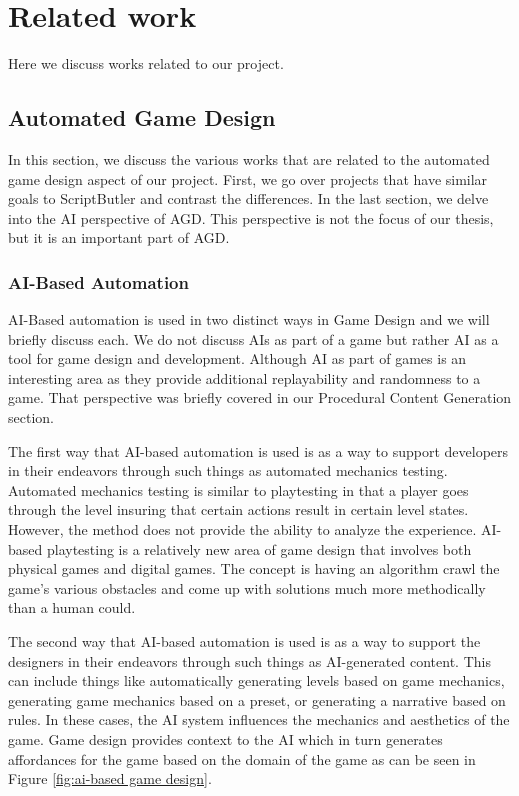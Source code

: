 \chapter{Related work}
\label{ch:related_work}
Here we discuss works related to our project.

\section{Automated Game Design}
In this section, we discuss the various works that are related to the automated game design aspect of our project. First, we go over projects that have similar goals to ScriptButler and contrast the differences. In the last section, we delve into the AI perspective of AGD. This perspective is not the focus of our thesis, but it is an important part of AGD.

\subsection{AI-Based Automation}
AI-Based automation is used in two distinct ways in Game Design and we will briefly discuss each. We do not discuss AIs as part of a game but rather AI as a tool for game design and development. Although AI as part of games is an interesting area as they provide additional replayability and randomness to a game. That perspective was briefly covered in our Procedural Content Generation section.

The first way that AI-based automation is used is as a way to support developers in their endeavors through such things as automated mechanics testing. Automated mechanics testing is similar to playtesting in that a player goes through the level insuring that certain actions result in certain level states. However, the method does not provide the ability to analyze the experience. AI-based playtesting is a relatively new area of game design that involves both physical games\cite{10.1145/3102071.3102105} and digital games. The concept is having an algorithm crawl the game's various obstacles and come up with solutions much more methodically than a human could.

The second way that AI-based automation is used is as a way to support the designers in their endeavors through such things as AI-generated content. This can include things like automatically generating levels based on game mechanics, generating game mechanics based on a preset, or generating a narrative based on rules. In these cases, the AI system influences the mechanics and aesthetics of the game. Game design provides context to the AI which in turn generates affordances for the game based on the domain of the game as can be seen in Figure \ref{fig:ai-based game design}.

